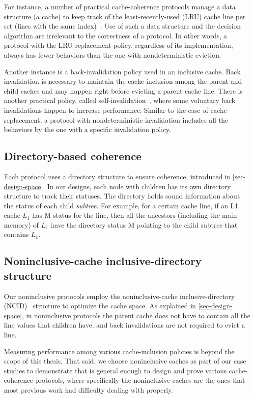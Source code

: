 For instance, a number of practical cache-coherence protocols manage a data structure (a cache) to keep track of the least-recently-used (LRU) cache line per set (lines with the same index)~\cite{cacheLRU}.
Use of such a data structure and the decision algorithm are irrelevant to the correctness of a protocol.
In other words, a protocol with the LRU replacement policy, regardless of its implementation, always has fewer behaviors than the one with nondeterministic eviction.

Another instance is a back-invalidation policy used in an inclusive cache.
Back invalidation is necessary to maintain the cache inclusion among the parent and child caches and may happen right before evicting a parent cache line.
There is another practical policy, called self-invalidation~\cite{Ros:2012}, where some voluntary back invalidations happen to increase performance.
Similar to the case of cache replacement, a protocol with nondeterministic invalidation includes all the behaviors by the one with a specific invalidation policy.

\subsection{Directory-based coherence}
\label{sec-dir-based}

Each protocol uses a directory structure to ensure coherence, introduced in \autoref{sec-design-space}.
In our designs, each node with children has its own directory structure to track their statuses.
The directory holds sound information about the status of each child \emph{subtree}.
For example, for a certain cache line, if an L1 cache $L_1$ has M status for the line, then all the ancestors (including the main memory) of $L_1$ have the directory status M pointing to the child subtree that contains $L_1$.

\subsection{Noninclusive-cache inclusive-directory structure}
\label{sec-inc-noninc}

Our noninclusive protocols employ the noninclusive-cache inclusive-directory (NCID)~\cite{Zhao:2010} structure to optimize the cache space.
As explained in \autoref{sec-design-space}, in noninclusive protocols the parent cache does not have to contain all the line values that children have, and back invalidations are not required to evict a line.

Measuring performance among various cache-inclusion policies is beyond the scope of this thesis.
That said, we choose noninclusive caches as part of our case studies to demonstrate that \hemiola{} is general enough to design and prove various cache-coherence protocols, where specifically the noninclusive caches are the ones that most previous work had difficulty dealing with properly.

